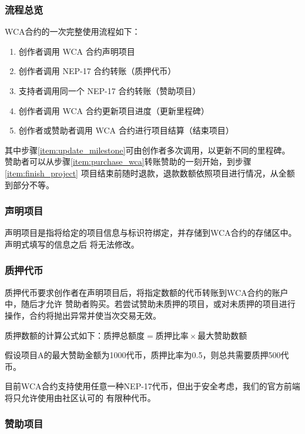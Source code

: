 \subsubsection{流程总览}

WCA合约的一次完整使用流程如下：

\begin{enumerate}
    \item 创作者调用 WCA 合约声明项目
    \item 创作者调用 NEP-17 合约转账（质押代币）
    \item 支持者调用同一个 NEP-17 合约转账（赞助项目）\label{item:purchase_wca}
    \item 创作者调用 WCA 合约更新项目进度（更新里程碑）\label{item:update_milestone}
    \item 创作者或赞助者调用 WCA 合约进行项目结算（结束项目）\label{item:finish_project}
\end{enumerate}

其中步骤\ref{item:update_milestone}可由创作者多次调用，以更新不同的里程碑。
赞助者可以从步骤\ref{item:purchase_wca}转账赞助的一刻开始，到步骤\ref{item:finish_project}
项目结束前随时退款，退款数额依照项目进行情况，从全额到部分不等。

\subsubsection{声明项目}

声明项目是指将给定的项目信息与标识符绑定，并存储到WCA合约的存储区中。声明式填写的信息之后
将无法修改。

\subsubsection{质押代币}

质押代币要求创作者在声明项目后，将指定数额的代币转账到WCA合约的账户中，随后才允许
赞助者购买。若尝试赞助未质押的项目，或对未质押的项目进行操作，合约将抛出异常并使当次交易无效。

质押数额的计算公式如下：$\text{质押总额度} = \text{质押比率} \times \text{最大赞助数额}$

假设项目A的最大赞助金额为1000代币，质押比率为0.5，则总共需要质押500代币。

目前WCA合约支持使用任意一种NEP-17代币，但出于安全考虑，我们的官方前端将只允许使用由社区认可的
有限种代币。

\subsubsection{赞助项目}


